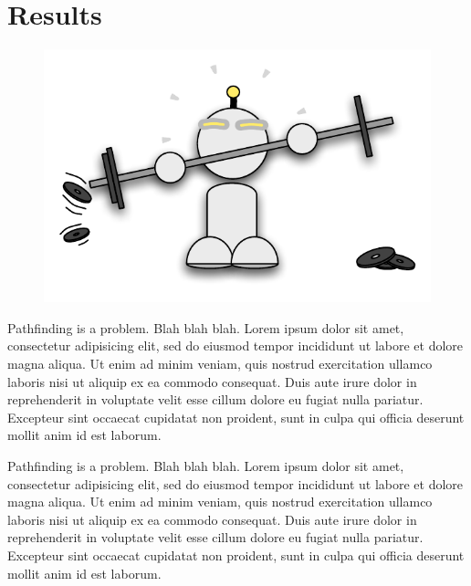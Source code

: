 \section{Results}
 \begin{figure}[h]
		\includegraphics[width=0.39\columnwidth, trim = 10mm 10mm 10mm 10mm]{diagrams/robot_weights.pdf}
 \end{figure}

Pathfinding is a problem. Blah blah blah.
Lorem ipsum dolor sit amet, consectetur adipisicing elit, sed do eiusmod
tempor incididunt ut labore et dolore magna aliqua. Ut enim ad minim
veniam, quis nostrud exercitation ullamco laboris nisi ut aliquip ex ea
commodo consequat. Duis aute irure dolor in reprehenderit in voluptate
velit esse cillum dolore eu fugiat nulla pariatur. Excepteur sint occaecat
cupidatat non proident, sunt in culpa qui officia deserunt mollit anim
id est laborum.


Pathfinding is a problem. Blah blah blah.
Lorem ipsum dolor sit amet, consectetur adipisicing elit, sed do eiusmod
tempor incididunt ut labore et dolore magna aliqua. Ut enim ad minim
veniam, quis nostrud exercitation ullamco laboris nisi ut aliquip ex ea
commodo consequat. Duis aute irure dolor in reprehenderit in voluptate
velit esse cillum dolore eu fugiat nulla pariatur. Excepteur sint occaecat
cupidatat non proident, sunt in culpa qui officia deserunt mollit anim
id est laborum.

